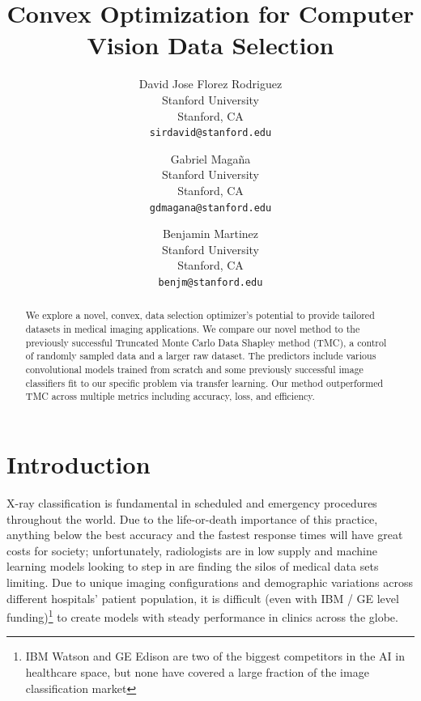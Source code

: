 \documentclass[10pt,twocolumn,letterpaper]{article}
\begin{document}
\title{Convex Optimization for Computer Vision Data Selection}

\author{David Jose Florez Rodriguez\\
Stanford University\\
Stanford, CA \\
{\tt\small sirdavid@stanford.edu}
\and
Gabriel Magaña\\
Stanford University\\
Stanford, CA\\
{\tt\small gdmagana@stanford.edu}
\and
Benjamin Martinez\\
Stanford University\\
Stanford, CA\\
{\tt\small benjm@stanford.edu}
}

\maketitle

\begin{abstract}
We explore a novel, convex, data selection optimizer's potential to provide tailored datasets in medical imaging applications. We compare our novel method to the previously successful Truncated Monte Carlo Data Shapley method (TMC), a control of randomly sampled data and a larger raw dataset. The predictors include various convolutional models trained from scratch and some previously successful image classifiers fit to our specific problem via transfer learning. Our method outperformed TMC across multiple metrics including accuracy, loss, and efficiency.
\end{abstract}

\section{Introduction}

 X-ray classification is fundamental in scheduled and emergency procedures throughout the world. Due to the life-or-death importance of this practice, anything below the best accuracy and the fastest response times will have great costs for society; unfortunately, radiologists are in low supply and machine learning models looking to step in are finding the silos of medical data sets limiting. Due to unique imaging configurations and demographic variations across different hospitals' patient population, it is difficult (even with IBM / GE level funding)\footnote{IBM Watson and GE Edison are two of the biggest competitors in the AI in healthcare space, but none have covered a large fraction of the image classification market} to create models with steady performance in clinics across the globe.
 
\end{document}
